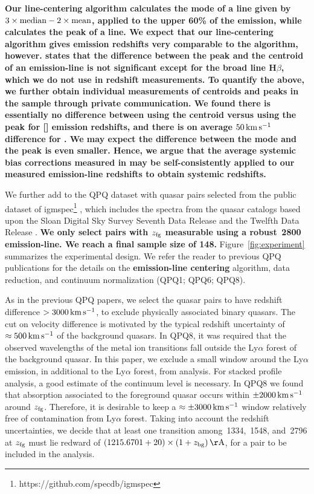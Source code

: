 \documentclass[iop]{emulateapj}
\begin{document}
{\bf Our line-centering algorithm calculates the mode of a line given by
$3\times{\rm median}-2\times{\rm mean}$, applied to the upper 60\% of the emission, while
\cite{Shen+16} calculates the peak of a line. We expect that our line-centering algorithm gives
emission redshifts very comparable to the \cite{Shen+16} algorithm, however. \cite{Shen+16}
states that the difference between the peak and the centroid of an emission-line
is not significant except for the broad line H$\beta$, which we do not use in redshift
measurements. To quantify the above, we further obtain individual measurements of centroids and
peaks in the \cite{Shen+16} sample through private communication. We found there is essentially no
difference between using the centroid versus using the peak for [] emission redshifts,
and there is on average $50\,{\rm km\,s^{-1}}$ difference for . We may expect the
difference between the mode and the peak is even smaller. Hence, we argue that the average
systemic bias corrections measured in \cite{Shen+16} may be self-consistently applied to our
measured emission-line redshifts to obtain systemic redshifts.}

We further add to the QPQ dataset with quasar pairs selected from the public dataset of 
igmspec\footnote{https://github.com/specdb/igmspec} \citep{Prochaska+17}, which includes the 
spectra from the quasar catalogs based upon the Sloan Digital Sky Survey Seventh Data Release 
\citep{Schneider+10} and the Twelfth Data Release \citep{Paris+17}. {\bf We only select pairs with
$z_{\rm fg}$ measurable using a robust \,2800 emission-line. 
We reach a final sample size of 148.}
Figure~\ref{fig:experiment} summarizes the experimental design. We refer the reader to previous 
QPQ publications for the details on the {\bf emission-line centering} algorithm, data reduction, and
continuum normalization (QPQ1; QPQ6; QPQ8).

As in the previous QPQ papers, we select the quasar pairs to have redshift difference 
$>3000\,{\rm km\,s^{-1}}$, to exclude physically associated binary quasars. The cut on velocity 
difference is motivated by the typical redshift uncertainty of $\approx500\,{\rm km\,s^{-1}}$ of 
the background quasars. In QPQ8, it was required that the observed wavelengths of the 
metal ion transitions fall outside the Ly$\alpha$ forest of the background quasar. In this paper, 
we exclude a small window around the Ly$\alpha$ emission, in additional to the Ly$\alpha$ forest, 
from analysis. For stacked profile analysis, a good estimate of 
the continuum level is necessary. In QPQ8 we found that absorption associated to 
the foreground quasar occurs within $\pm2000\,{\rm km\,s^{-1}}$ around $z_{\rm fg}$. Therefore, it 
is desirable to keep a $\approx\pm3000\,{\rm km\,s^{-1}}$ window relatively free of contamination 
from Ly$\alpha$ forest. Taking into account the redshift uncertainties, 
we decide that at least one transition among \,1334, \,1548, and 
\,2796 at $z_{\rm fg}$ must lie redward of 
$(1215.6701+20)\times(1+z_{\rm bg})\,{\rm \AA}$, for a pair to be included in the analysis. 
\end{document}
